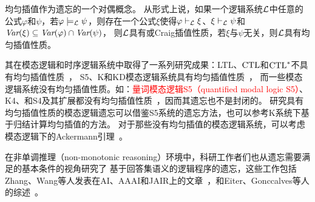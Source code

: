 均匀插值作为遗忘的一个对偶概念。
从形式上说，如果一个逻辑系统${\cal L}$中任意的公式$\varphi$和$\psi$，若$\varphi\models_{\cal L} \psi$，则存在一个公式$\xi$使得$\varphi\vdash_{\cal L}\xi$、$\xi\vdash_{\cal L}\psi$和 $\textit{Var}(\xi)\subseteq \textit{Var}(\varphi)\cap \textit{Var}(\psi)$，
则${\cal L}$具有或Craig插值性质，若$\xi$与$\psi$无关，则${\cal L}$具有均匀插值性质。

其在模态逻辑和时序逻辑系统中取得了一系列研究成果：LTL、$\textrm{CTL}$和$\textrm{CTL}^*$不具有均匀插值性质~\cite{Maksimova:JANCL:1991,DAgostino:synthese:2008}，
S5、K和KD模态逻辑系统具有均匀插值性质~\cite{DBLP:journals/aml/Iemhoff19}，
而一些模态逻辑系统没有均匀插值性质。如：\textcolor{red}{量词模态逻辑S5（quantified modal logic S5）}\cite{DBLP:journals/jsyml/Fine79}、K4、和S4及其扩展都没有均匀插值性质~\cite{DBLP:journals/ndjfl/Schumm86}，因而其遗忘也不是封闭的。
研究具有均匀插值性质的模态逻辑遗忘可以借鉴S5系统的遗忘方法，也可以参考K系统下基于归结计算均匀插值的方法。
对于那些没有均匀插值的模态逻辑系统，可以考虑模态逻辑下的Ackermann引理~\cite{DBLP:books/daglib/0023036}。




在非单调推理（non-monotonic reasoning）环境中，科研工作者们也从遗忘需要满足的基本条件的视角研究了
基于回答集语义的逻辑程序的遗忘，这些工作包括Zhang、Wang等人发表在AI、AAAI和JAIR上的文章~\cite{DBLP:Zhang:AIJ2006,DBLP:journals/ai/EiterW08,Wong:PhD:Thesis,DBLP:journals/jair/WangZZZ14,wang2013forgetting,DBLP:conf/aaai/WangWWZ15,DBLP:journals/jair/Delgrande17,gonccalves2020limits}，和Eiter、Gonccalves等人的综述~\cite{eiter2019brief,gonccalves2021forgetting}。


